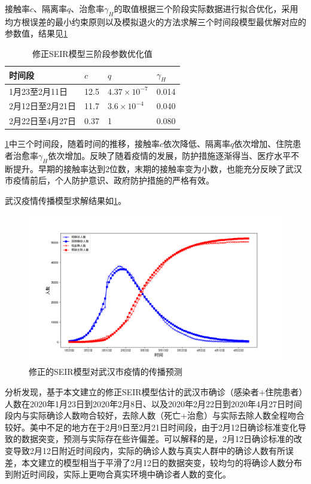 \documentclass[withoutpre]{cumcmthesis} %
\begin{document}
接触率$c$、隔离率$q$、治愈率$\gamma_H$的取值根据三个阶段实际数据进行拟合优化，采用均方根误差的最小约束原则以及模拟退火的方法求解三个时间段模型最优解对应的参数值，结果见\cref{tab:optipara}

\begin{table}[H]
    \caption{修正SEIR模型三阶段参数优化值}
    \label{tab:optipara} \centering
    \begin{tabular}{p{5cm}p{3cm}p{3cm}p{3cm}}
        \toprule[1.5pt]
        \textbf{时间段} & $c$ & $q$ & $\gamma_H$ \\
        \midrule[1pt]
        1月23至2月11日 &12.5&  $4.37 \times 10^{-7}$& 0.014\\
        2月12日至2月21日& 11.7& $3.6\times 10^{-4}$&0.040 \\
        2月22日至4月27日 &0.37&1&0.080 \\
        \bottomrule[1.5pt]
    \end{tabular}
\end{table}

\cref{tab:optipara}中三个时间段，随着时间的推移，接触率$c$依次降低、隔离率$q$依次增加、住院患者治愈率$\gamma_H$依次增加。反映了随着疫情的发展，防护措施逐渐得当、医疗水平不断提升。早期的接触率达到2位数，末期的接触率变为小数，也能充分反映了武汉市疫情前后，个人防护意识、政府防护措施的严格有效。 

武汉疫情传播模型求解结果如\cref{fig:model}。
\begin{figure}[!h]
    \centering
    \includegraphics[width=1.0\textwidth]{figures/Model_predict_and_realNum_Graph.png}
    \caption{修正的SEIR模型对武汉市疫情的传播预测}
    \label{fig:model}
\end{figure}

分析发现，基于本文建立的修正SEIR模型估计的武汉市确诊（感染者+住院患者）人数在2020年1月23日到2020年2月8日、以及2020年2月22日到2020年4月27日时间段内与实际确诊人数吻合较好，去除人数（死亡+治愈）与实际去除人数全程吻合较好。美中不足的地方在于2月9日至2月21日时间段，由于2月12日确诊标准变化导致的数据突变，预测与实际存在些许偏差。可以解释的是，2月12日确诊标准的改变导致2月12日附近时间段内，实际的确诊人数与真实人群中的确诊人数有所误差，本文建立的模型相当于平滑了2月12日的数据突变，较均匀的将确诊人数分布到附近时间段，实际上更吻合真实环境中确诊者人数的变化。
\end{document}
